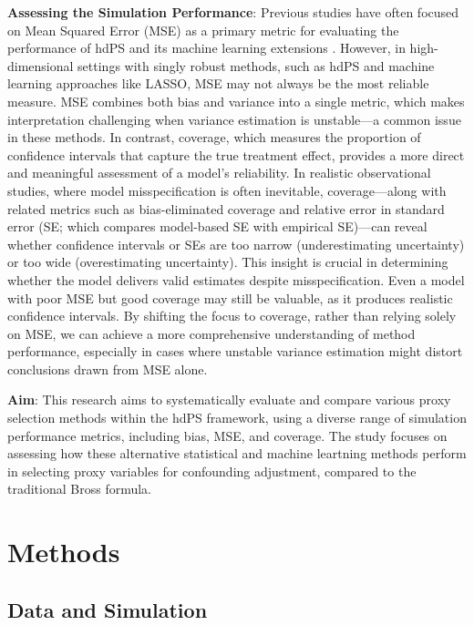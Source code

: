 \documentclass[sn-vancouver,Numbered,lineno,pdflatex]{sn-jnl}
\begin{document}
\textbf{Assessing the Simulation Performance}: Previous studies have
often focused on Mean Squared Error (MSE) as a primary metric for
evaluating the performance of hdPS and its machine learning extensions
\citep{karim2018can, franklin2015regularized}. However, in
high-dimensional settings with singly robust methods, such as hdPS and
machine learning approaches like LASSO, MSE may not always be the most
reliable measure. MSE combines both bias and variance into a single
metric, which makes interpretation challenging when variance estimation
is unstable---a common issue in these methods. In contrast, coverage,
which measures the proportion of confidence intervals that capture the
true treatment effect, provides a more direct and meaningful assessment
of a model's reliability. In realistic observational studies, where
model misspecification is often inevitable, coverage---along with
related metrics such as bias-eliminated coverage and relative error in
standard error (SE; which compares model-based SE with empirical
SE)---can reveal whether confidence intervals or SEs are too narrow
(underestimating uncertainty) or too wide (overestimating uncertainty).
This insight is crucial in determining whether the model delivers valid
estimates despite misspecification. Even a model with poor MSE but good
coverage may still be valuable, as it produces realistic confidence
intervals. By shifting the focus to coverage, rather than relying solely
on MSE, we can achieve a more comprehensive understanding of method
performance, especially in cases where unstable variance estimation
might distort conclusions drawn from MSE alone.

\textbf{Aim}: This research aims to systematically evaluate and compare
various proxy selection methods within the hdPS framework, using a
diverse range of simulation performance metrics, including bias, MSE,
and coverage. The study focuses on assessing how these alternative
statistical and machine leartning methods perform in selecting proxy
variables for confounding adjustment, compared to the traditional Bross
formula.

\section{Methods}\label{methods}

\subsection*{Data and Simulation}\label{data-and-simulation}
\end{document}
